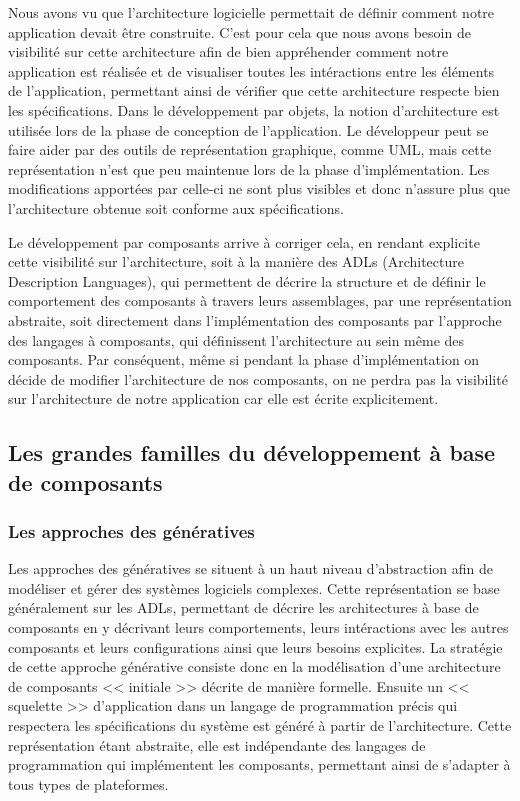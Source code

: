  Nous avons vu que l'architecture logicielle permettait de définir comment notre application devait être construite. C'est pour cela que nous avons besoin de visibilité sur cette architecture afin de bien appréhender comment notre application est réalisée et de visualiser toutes les intéractions entre les éléments de l'application, permettant ainsi de vérifier que cette architecture respecte bien les spécifications. Dans le développement par objets, la notion d'architecture est utilisée lors de la phase de conception de l'application. Le développeur peut se faire aider par des outils de représentation graphique, comme UML, mais cette représentation n'est que peu maintenue lors de la phase d'implémentation. Les modifications apportées par celle-ci ne sont plus visibles et donc n'assure plus que l'architecture obtenue soit conforme aux spécifications. \\\par
  
  Le développement par composants arrive à corriger cela, en rendant explicite cette visibilité sur l'architecture, soit à la manière des ADLs (Architecture Description Languages), qui permettent de décrire la structure et de définir le comportement des composants à travers leurs assemblages, par une représentation abstraite, soit directement dans l'implémentation des composants par l'approche des langages à composants, qui définissent l'architecture au sein même des composants. Par conséquent, même si pendant la phase d'implémentation on décide de modifier l'architecture de nos composants, on ne perdra pas la visibilité sur l'architecture de notre application car elle est écrite explicitement. \\\par
  
\subsection{Les grandes familles du développement à base de composants}
      
      \subsubsection{Les approches des génératives}
      
      Les approches des génératives se situent à un haut niveau d'abstraction afin de modéliser et gérer des systèmes logiciels complexes. Cette représentation se base généralement sur les ADLs, permettant de décrire les architectures à base de composants en y décrivant leurs comportements, leurs intéractions avec les autres composants et leurs configurations ainsi que leurs besoins explicites. La stratégie de cette approche générative consiste donc en la modélisation d'une architecture de composants << initiale >> décrite de manière formelle. Ensuite un << squelette >> d'application dans un langage de programmation précis qui respectera les spécifications du système est généré à partir de l'architecture. Cette représentation étant abstraite, elle est indépendante des langages de programmation qui implémentent les composants, permettant ainsi de s'adapter à tous types de plateformes. \\\par
      

